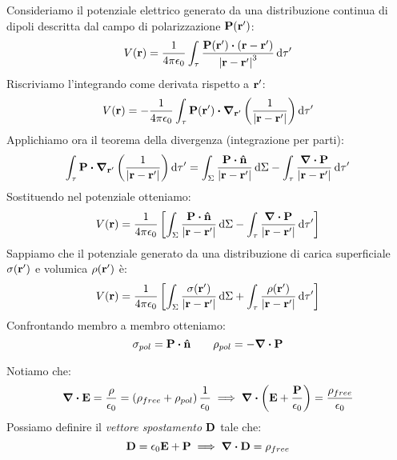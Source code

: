 \documentclass[12pt,a4paper]{article}
\begin{document}
Consideriamo il potenziale elettrico generato da una distribuzione continua di dipoli descritta dal campo di polarizzazione $\vb{P}(\vb{r}')$:
\begin{equation*}
    V(\vb{r}) = \frac{1}{4\pi\epsilon_0} \int_\tau \frac{ \vb{P}(\vb{r}') \vdot (\vb{r} - \vb{r}') }{ \abs{\vb{r} - \vb{r}'}^3 } \dd{\tau'}
\end{equation*}
Riscriviamo l'integrando come derivata rispetto a $\vb{r}'$:
\begin{equation*}
    V(\vb{r}) = -\frac{1}{4\pi\epsilon_0} \int_\tau \vb{P}(\vb{r}') \vdot \grad_{\vb{r}'} \left( \frac{1}{\abs{\vb{r} - \vb{r}'}} \right) \dd{\tau'}
\end{equation*}
Applichiamo ora il teorema della divergenza (integrazione per parti):
\begin{equation*}
    \int_\tau \vb{P} \vdot \grad_{\vb{r}'} \left( \frac{1}{\abs{\vb{r} - \vb{r}'}} \right) \dd{\tau'}
    = \int_{\Sigma} \frac{ \vb{P} \vdot \vu{n} }{ \abs{\vb{r} - \vb{r}'} } \dd{\Sigma}
    - \int_\tau \frac{ \div \vb{P} }{ \abs{\vb{r} - \vb{r}'} } \dd{\tau'}
\end{equation*}
Sostituendo nel potenziale otteniamo:
\begin{equation*}
    V(\vb{r}) = \frac{1}{4\pi\epsilon_0} \left[
        \int_{\Sigma} \frac{ \vb{P} \vdot \vu{n} }{ \abs{\vb{r} - \vb{r}'} } \dd{\Sigma}
        - \int_\tau \frac{ \div \vb{P} }{ \abs{\vb{r} - \vb{r}'} } \dd{\tau'}
    \right]
\end{equation*}
Sappiamo che il potenziale generato da una distribuzione di carica superficiale $\sigma(\vb{r}')$ e volumica $\rho(\vb{r}')$ è:
\begin{equation*}
    V(\vb{r}) = \frac{1}{4\pi\epsilon_0} \left[
        \int_{\Sigma} \frac{ \sigma(\vb{r}') }{ \abs{\vb{r} - \vb{r}'} } \dd{\Sigma}
        + \int_\tau \frac{ \rho(\vb{r}') }{ \abs{\vb{r} - \vb{r}'} } \dd{\tau'}
    \right]
\end{equation*}
Confrontando membro a membro otteniamo:
\begin{equation*}
    \sigma_{pol} = \vb{P} \vdot \vu{n} \qquad
    \rho_{pol} = -\div \vb{P}
\end{equation*}


Notiamo che:
\begin{equation*}
    \div\vb{E}=\frac{\rho}{\epsilon_0}= \left( \rho_{free} +\rho_{pol} \right) \frac{1}{\epsilon_0}\implies \div(\vb{E}+\frac{\vb{P}}{\epsilon_0})= \frac{\rho_{free}}{\epsilon_0}
\end{equation*}
Possiamo definire il \textit{vettore spostamento} $\vb{D}$ tale che:
\begin{equation*}
    \vb{D}= \epsilon_0\vb{E} + \vb{P} \implies \div \vb{D} = \rho_{free}
\end{equation*}
\end{document}
